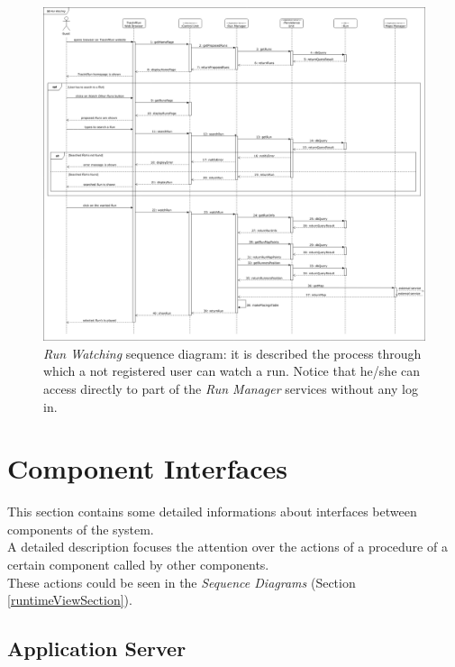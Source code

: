 \begin{figure}[H]
  \begin{center}
  	\includegraphics[width=\textwidth]{./img/sequence/watchRun.png}
    \hspace{0.05\linewidth}
    \centering
    \caption{\textit{Run Watching} sequence diagram: it is described the process through which a not registered user can watch a run. Notice that he/she can access directly to part of the \textit{Run Manager} services without any log in.}
		\label{img:watchRun}
    \end{center}
\end{figure}


\clearpage

\section{Component Interfaces}
This section contains some detailed informations about interfaces between components of the system.\\
A detailed description focuses the attention over the actions of a procedure of a certain component called by other components.\\
These actions could be seen in the \textit{Sequence Diagrams} (Section \ref{runtimeViewSection}).

\subsection{Application Server}

